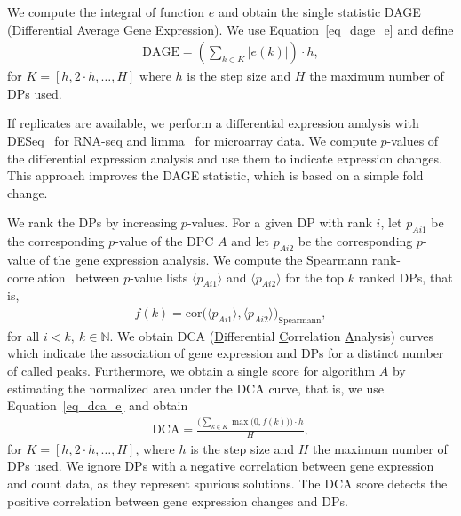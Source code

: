 We compute the integral of function $e$ and obtain the single statistic DAGE (\underline{D}ifferential \underline{A}verage \underline{G}ene \underline{E}xpression).
We use Equation~\ref{eq_dage_e} and define
\begin{align}
 \text{DAGE} =  \left( \sum_{k \in K} \left| e(k) \right| \right) \cdot h \label{eq_dage},
\end{align}
for $ K = [h, 2 \cdot h, \ldots, H]$ where $h$ is the step size and $H$ the maximum number of DPs used.

If replicates are available, we perform a differential expression analysis with DESeq~\citep{anders2010} for RNA-seq and limma~\citep{Ritchie2015} for microarray data. 
We compute $p$-values of the differential expression analysis and use them to indicate expression changes. 
This approach improves the DAGE statistic, which is based on a simple fold change.

We rank the DPs by increasing $p$-values. 
For a given DP with rank $i$, let $p_{Ai1}$ be the corresponding $p$-value of the DPC $A$ and let $p_{Ai2}$ be the corresponding $p$-value of the gene expression analysis.
We compute the Spearmann rank-correlation~\citep{Spearman1904} between $p$-value lists $\langle p_{Ai1} \rangle$ and $\langle p_{Ai2} \rangle$ for the top $k$ ranked DPs, that is,
\begin{align}
 f(k) = \text{cor}\big(\langle p_{Ai1} \rangle, \langle p_{Ai2} \rangle \big)_{\text{Spearmann}} \label{eq_dca_e}, 
\end{align}
for all $i < k,\ k \in \mathbb{N}$.
We obtain DCA (\underline{D}ifferential \underline{C}orrelation \underline{A}nalysis) curves which indicate the association of gene expression and DPs for a distinct number of called peaks.
Furthermore, we obtain a single score for algorithm $A$ by estimating the normalized area under the DCA curve, that is, we use Equation~\ref{eq_dca_e} and obtain
\begin{align}
 \text{DCA} = \frac{\bigg(\sum_{k \in K} \max\big(0, f(k)\big)\bigg) \cdot h}{H} \label{eq_dca},
\end{align}
for $ K = [h, 2 \cdot h, \ldots, H]$, where $h$ is the step size and $H$ the maximum number of DPs used.
We ignore DPs with a negative correlation between gene expression and count data, as they represent spurious solutions.
The DCA score detects the positive correlation between gene expression changes and DPs. 

